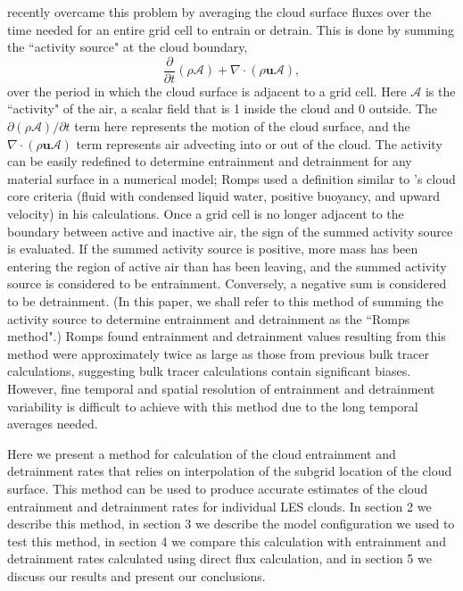 \documentclass[12pt]{article}
\begin{document}
\cite{Romps2010} recently overcame this problem by averaging the cloud surface 
fluxes over the time needed for an entire grid cell to entrain or detrain.   
This is done by summing the ``activity source" at the cloud boundary, 
\begin{equation}
\label{eq:romps_activity}
  \frac{\partial}{\partial t}(\rho \mathcal{A}) 
  + \nabla \cdot (\rho \mathbf{u} \mathcal{A}),
\end{equation}
over the period in which the cloud surface is adjacent to a grid cell.  Here 
$\mathcal{A}$ is the ``activity" of the air, a scalar field that is 1 inside 
the cloud and 0 outside.  The $\partial(\rho \mathcal{A}) / \partial t$ term 
here represents the motion of the cloud surface, and the 
$\nabla \cdot (\rho \mathbf{u} \mathcal{A})$ term represents air advecting into 
or out of the cloud.  The activity can be easily redefined to determine 
entrainment and detrainment for any material surface in a numerical model; 
Romps used a definition similar to \cite{Siebesma1995}'s cloud core criteria 
(fluid with condensed liquid water, positive buoyancy, and upward velocity) in 
his calculations.  Once a grid cell is no longer adjacent to the boundary 
between active and inactive air, the sign of the summed activity source is 
evaluated.  If the summed activity source is positive, more mass has been 
entering the region of active air than has been leaving, and the summed 
activity source is considered to be entrainment.  Conversely, a negative sum is 
considered to be detrainment.  (In this paper, we shall refer to this method of 
summing the activity source to determine entrainment and detrainment as the 
``Romps method".)  Romps found entrainment and detrainment values resulting 
from this method were approximately twice as large as those from previous bulk 
tracer calculations, suggesting bulk tracer calculations contain significant 
biases.  However, fine temporal and spatial resolution of entrainment and 
detrainment variability is difficult to achieve with this method due to the 
long temporal averages needed.

Here we present a method for calculation of the cloud entrainment and 
detrainment rates that relies on interpolation of the subgrid location of 
the cloud surface.  This method can be used to produce accurate estimates of 
the cloud entrainment and detrainment rates for individual LES clouds.  In 
section 2 we describe this method, in section 3 we describe the 
model configuration we used to test this method, in section 4 we compare this 
calculation with entrainment and detrainment rates calculated using 
\cite{Romps2010} direct flux calculation, and in section 5 we discuss 
our results and present our conclusions.  
\end{document}
